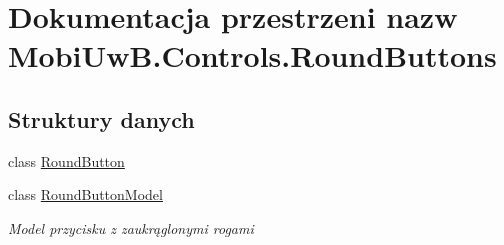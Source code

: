 \hypertarget{a00268}{}\section{Dokumentacja przestrzeni nazw Mobi\+Uw\+B.\+Controls.\+Round\+Buttons}
\label{a00268}
\subsection*{Struktury danych}
\begin{DoxyCompactItemize}
\item 
class \hyperlink{a00050}{Round\+Button}
\item 
class \hyperlink{a00051}{Round\+Button\+Model}
\begin{DoxyCompactList}\small\item\em Model przycisku z zaukrąglonymi rogami \end{DoxyCompactList}\end{DoxyCompactItemize}

